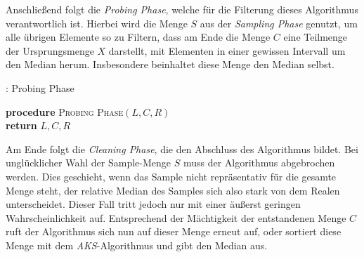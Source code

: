 %
\vspace*{.4cm}
%
\noindent
Anschließend folgt die \textit{Probing Phase}, welche für die Filterung dieses Algorithmus verantwortlich ist. Hierbei wird die Menge $S$ aus der \textit{Sampling Phase} genutzt, um alle übrigen Elemente so zu Filtern, dass am Ende die Menge $C$ eine Teilmenge der Ursprungsmenge $X$ darstellt, mit Elementen in einer gewissen Intervall um den Median herum. Insbesondere beinhaltet diese Menge den Median selbst.\\[.2cm]
\label{algo: rmed_2}%

\begin{algorithm}[H]
	\SetAlgoLined
	\caption{\RM : Probing Phase}
	\textbf{procedure} \textsc{Probing Phase}$(L, C, R)$\\
	\textbf{return} $L,C,R$
\end{algorithm}
%
\vspace*{.4cm}
%
\noindent
Am Ende folgt die \textit{Cleaning Phase}, die den Abschluss des Algorithmus bildet. Bei unglücklicher Wahl der Sample-Menge $S$ muss der Algorithmus abgebrochen werden. Dies geschieht, wenn das Sample nicht repräsentativ für die gesamte Menge steht, der relative Median des Samples sich also stark von dem Realen unterscheidet. Dieser Fall tritt jedoch nur mit einer äußerst geringen Wahrscheinlichkeit auf. Entsprechend der Mächtigkeit der entstandenen Menge $C$ ruft der Algorithmus sich nun auf dieser Menge erneut auf, oder sortiert diese Menge mit dem \textit{AKS}-Algorithmus und gibt den Median aus.\\[.2cm]
\label{algo: rmed_3}%

